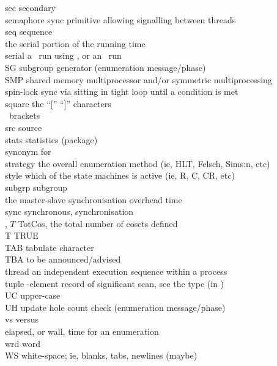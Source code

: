 \begin{tabbing}
sec	   	\> secondary \\
semaphore  	\> sync primitive allowing signalling between threads \\
seq	   	\> sequence \\
  	\> the serial portion of the running time \\
serial	   	\> a \pace\ run using , or an \ace\ run \\
SG         	\> subgroup generator (enumeration message/phase) \\
SMP        	\> shared memory multiprocessor and/or symmetric multiprocessing \\
spin-lock  	\> sync via sitting in tight loop until a condition is met \\
square 	   	\> the ``['' \amp ``]'' characters \\
\ brackets 	\> \\
src	   	\> source \\
stats      	\> statistics (package) \\
	\> synonym for  \\
strategy   	\> the overall enumeration method (ie, HLT, Felsch, Sims:n, etc) \\
style	   	\> which of the state machines is active (ie, R, C, CR, etc) \\
subgrp	   	\> subgroup \\
 	\> the master-slave synchronisation overhead time \\
sync       	\> synchronous, synchronisation \\
, $T$	\> TotCos, the total number of cosets defined \\
T          	\> TRUE \\
TAB	   	\> tabulate character \\
TBA	   	\> to be announced/advised \\
thread	   	\> an independent execution sequence within a process \\
tuple      	-element record of significant scan, see the  type (in ) \\
UC	   	\> upper-case \\
UH         	\> update hole count check (enumeration message/phase) \\
vs	   	\> versus \\
	\> elapsed, or wall, time for an enumeration \\
wrd        	\> word \\
WS	   	\> white-space; ie, blanks, tabs, \amp newlines (maybe) 
\end{tabbing}

